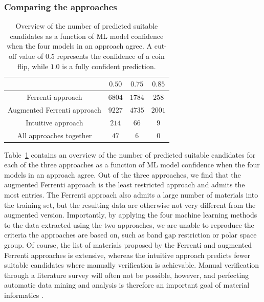 \documentclass[superscriptaddress,unsortedaddress,
 amsmath,amssymb,
 aps,
]{revtex4-2}
\begin{document}
\subsubsection*{Comparing the approaches}

\begin{table}[b]
    \centering 
    \caption{Overview of the number of predicted suitable candidates as a function of ML model confidence when the four models in an approach agree. A cut-off value of $0.5$ represents the confidence of a coin flip, while $1.0$ is a fully confident prediction.}
    \begin{tabular}{c|c|c|c}
      & $0.50$ & $0.75$ & $0.85$ \\
     \hline
     Ferrenti approach &  $6804$ & $1784$ & $258$  \\
     Augmented Ferrenti approach &  $9227$ & $4735$  & $2001$  \\ 
     Intuitive approach & $214$ & $66$ & $9$ \\
     \hline
     All approaches together & $47$ & $6$ & 0 \\
    \end{tabular}
    \label{tab:probabilites}
\end{table} 

Table~\ref{tab:probabilites} contains an overview of the number of predicted suitable candidates for each of the three approaches as a function of ML model confidence when the four models in an approach agree. 
Out of the three approaches, we find that the augmented Ferrenti approach is the least restricted approach and admits the most entries. The Ferrenti approach also admits a large number of materials into the training set, but the resulting data are otherwise not very different from the augmented version. 
Importantly, by applying the four machine learning methods to the data extracted using the two approaches, we are unable to reproduce the criteria the approaches are based on, such as band gap restriction or polar space group. Of course, the list of materials proposed by the Ferrenti and augmented Ferrenti approaches is extensive, whereas the intuitive approach predicts fewer suitable candidates where manually verification is achievable.  
Manual verification through a literature survey will often not be possible, however, and perfecting automatic data mining and analysis is therefore an important goal of material informatics \cite{rickman2019}. 
\end{document}

